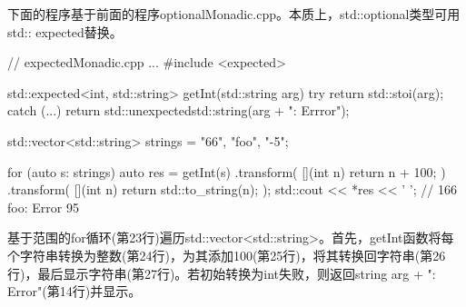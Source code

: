 下面的程序基于前面的程序optionalMonadic.cpp。本质上，std::optional类型可用std:: expected替换。


\begin{cpp}
// expectedMonadic.cpp
...
#include <expected>

std::expected<int, std::string> getInt(std::string arg) {
	try {
		return std::stoi(arg);
	}
	catch (...) {
		return std::unexpected{std::string(arg + ": Errror")};
	}
}

std::vector<std::string> strings = {"66", "foo", "-5"};

for (auto s: strings) {
	auto res = getInt(s)
				.transform( [](int n) { return n + 100; })
				.transform( [](int n) { return std::to_string(n); });
	std::cout << *res << ' '; // 166 foo: Error 95
}
\end{cpp}

基于范围的for循环(第23行)遍历std::vector<std::string>。首先，getInt函数将每个字符串转换为整数(第24行)，为其添加100(第25行)，将其转换回字符串(第26行)，最后显示字符串(第27行)。若初始转换为int失败，则返回string arg + ": Error"(第14行)并显示。







































